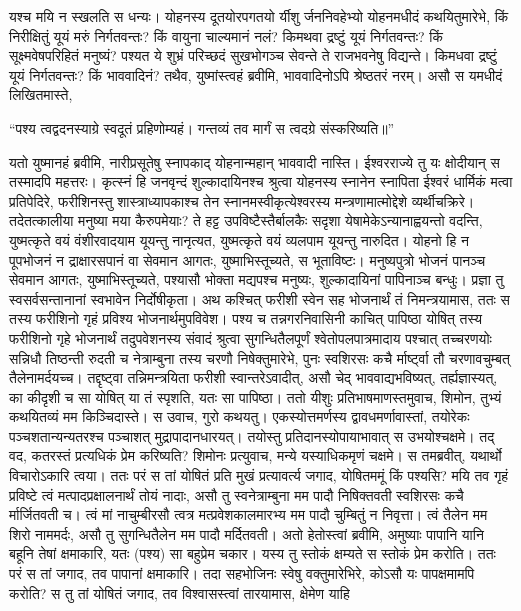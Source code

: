 \vakya यश्च मयि न स्खलति स धन्यः।
\vakya योहनस्य दूतयोरपगतयो र्यीशु र्जननिवहेभ्यो योहनमधीदं कथयितुमारेभे, किं निरीक्षितुं यूयं मरुं निर्गतवन्तः? किं वायुना चाल्यमानं नलं?
\vakya किमथवा द्रष्टुं यूयं निर्गतवन्तः? किं सूक्ष्मवेषपरिहितं मनुष्यं? पश्यत ये शुभ्रं परिच्छदं सुखभोगञ्च सेवन्ते ते राजभवनेषु विद्यन्ते।
\vakya किमधवा द्रष्टुं यूयं निर्गतवन्तः? किं भाववादिनं? तथैव, युष्मांस्त्वहं ब्रवीमि, भाववादिनोऽपि श्रेष्ठतरं नरम्।
\vakya असौ स यमधीदं लिखितमास्ते,
\begin{poem}
\startwithline “पश्य त्वद्वदनस्याग्रे स्वदूतं प्रहिणोम्यहं।
\pline गन्तव्यं तव मार्गं स त्वदग्रे संस्करिष्यति॥”
\end{poem}
\vakya यतो युष्मानहं ब्रवीमि, नारीप्रसूतेषु स्नापकाद् योहनान्महान् भाववादी नास्ति। ईश्वरराज्ये तु यः क्षोदीयान् स तस्मादपि महत्तरः।
\vakya कृत्स्नं हि जनवृन्दं शुल्कादायिनश्च श्रुत्वा योहनस्य स्नानेन स्नापिता ईश्वरं धार्मिकं मत्वा प्रतिपेदिरे,
\vakya फरीशिनस्तु शास्त्राध्यापकाश्च तेन स्नानमस्वीकृत्येश्वरस्य मन्त्रणामात्मोद्देशे व्यर्थीचक्रिरे।
\vakya तदेतत्कालीया मनुष्या मया कैरुपमेयाः?
\vakya ते हट्ट उपविष्टैस्तैर्बालकैः सदृशा येषामेकेऽन्यानाह्वयन्तो वदन्ति, युष्मत्कृते वयं वंशीरवादयाम यूयन्तु नानृत्यत, युष्मत्कृते वयं व्यलपाम यूयन्तु नारुदित।
\vakya योहनो हि न पूपभोजनं न द्राक्षारसपानं वा सेवमान आगतः, युष्माभिस्तूच्यते, स भूताविष्टः।
\vakya मनुष्यपुत्रो भोजनं पानञ्च सेवमान आगतः, युष्माभिस्तूच्यते, पश्यासौ भोक्ता मद्यपश्च मनुष्यः, शुल्कादायिनां पापिनाञ्च बन्धुः।
\vakya प्रज्ञा तु स्वसर्वसन्तानानां स्वभावेन निर्दोषीकृता।
\vakya अथ कश्चित् फरीशी स्वेन सह भोजनार्थं तं निमन्त्रयामास, ततः स तस्य फरीशिनो गृहं प्रविश्य भोजनार्थमुपविवेश।
\vakya पश्य च तन्नगरनिवासिनी काचित् पापिष्ठा योषित् तस्य फरीशिनो गृहे भोजनार्थं तदुपवेशनस्य संवादं श्रुत्वा सुगन्धितैलपूर्णं श्वेतोपलपात्रमादाय
\vakya पश्चात् तच्चरणयोः सन्निधौ तिष्ठन्ती रुदती च नेत्राम्बुना तस्य चरणौ निषेक्तुमारेभे, पुनः स्वशिरसः कचै र्मार्ष्ट्वा तौ चरणावचुम्बत् तैलेनामर्दयच्च।
\vakya तद्दृष्ट्वा तन्निमन्त्रयिता फरीशी स्वान्तरेऽवादीत्, असौ चेद् भाववाद्यभविष्यत्, तर्ह्यज्ञास्यत्, का कीदृशी च सा योषित् या तं स्पृशति, यतः सा पापिष्ठा।
\vakya ततो यीशुः प्रतिभाषमाणस्तमुवाच, शिमोन, तुभ्यं कथयितव्यं मम किञ्चिदास्ते। स उवाच, गुरो कथयतु।
\vakya एकस्योत्तमर्णस्य द्वावधमर्णावास्तां, तयोरेकः पञ्चशतान्यन्यतरश्च पञ्चाशत् मुद्रापादानधारयत्।
\vakya तयोस्तु प्रतिदानस्योपायाभावात् स उभयोश्चक्षमे। तद् वद, कतरस्तं प्रत्यधिकं प्रेम करिष्यति?
\vakya शिमोनः प्रत्युवाच, मन्ये यस्याधिकमृणं चक्षमे। स तमब्रवीत्, यथार्थो विचारोऽकारि त्वया।
\vakya ततः परं स तां योषितं प्रति मुखं प्रत्यावर्त्य जगाद, योषितममूं किं पश्यसि? मयि तव गृहं प्रविष्टे त्वं मत्पादप्रक्षालनार्थं तोयं नादाः, असौ तु स्वनेत्राम्बुना मम पादौ निषिक्तवती स्वशिरसः कचै र्मार्जितवती च।
\vakya त्वं मां नाचुम्बीरसौ त्वत्र मत्प्रवेशकालमारभ्य मम पादौ चुम्बितुं न निवृत्ता।
\vakya त्वं तैलेन मम शिरो नाममर्दः, असौ तु सुगन्धितैलेन मम पादौ मर्दितवती।
\vakya अतो हेतोस्त्वां ब्रवीमि, अमुष्याः पापानि यानि बहूनि तेषां क्षमाकारि, यतः (पश्य) सा बहुप्रेम चकार। यस्य तु स्तोकं क्षम्यते स स्तोकं प्रेम करोति।
\vakya ततः परं स तां जगाद, तव पापानां क्षमाकारि।
\vakya तदा सहभोजिनः स्वेषु वक्तुमारेभिरे, कोऽसौ यः पापक्षमामपि करोति?
\vakya स तु तां योषितं जगाद, तव विश्वासस्त्वां तारयामास, क्षेमेण याहि\eoc